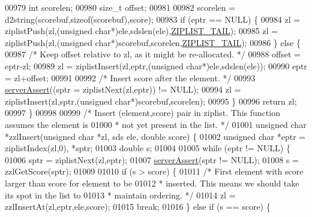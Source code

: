 \begin{DoxyCode}
00979     \textcolor{keywordtype}{int} scorelen;
00980     size\_t offset;
00981 
00982     scorelen = d2string(scorebuf,\textcolor{keyword}{sizeof}(scorebuf),score);
00983     \textcolor{keywordflow}{if} (eptr == NULL) \{
00984         zl = ziplistPush(zl,(\textcolor{keywordtype}{unsigned} \textcolor{keywordtype}{char}*)ele,sdslen(ele),\hyperlink{ziplist_8h_a25d058a2c2c0db0f131f84d23ede6ba2}{ZIPLIST\_TAIL});
00985         zl = ziplistPush(zl,(\textcolor{keywordtype}{unsigned} \textcolor{keywordtype}{char}*)scorebuf,scorelen,\hyperlink{ziplist_8h_a25d058a2c2c0db0f131f84d23ede6ba2}{ZIPLIST\_TAIL});
00986     \} \textcolor{keywordflow}{else} \{
00987         \textcolor{comment}{/* Keep offset relative to zl, as it might be re-allocated. */}
00988         offset = eptr-zl;
00989         zl = ziplistInsert(zl,eptr,(\textcolor{keywordtype}{unsigned} \textcolor{keywordtype}{char}*)ele,sdslen(ele));
00990         eptr = zl+offset;
00991 
00992         \textcolor{comment}{/* Insert score after the element. */}
00993         \hyperlink{server_8h_a88114b5169b4c382df6b56506285e56a}{serverAssert}((sptr = ziplistNext(zl,eptr)) != NULL);
00994         zl = ziplistInsert(zl,sptr,(\textcolor{keywordtype}{unsigned} \textcolor{keywordtype}{char}*)scorebuf,scorelen);
00995     \}
00996     \textcolor{keywordflow}{return} zl;
00997 \}
00998 
00999 \textcolor{comment}{/* Insert (element,score) pair in ziplist. This function assumes the element is}
01000 \textcolor{comment}{ * not yet present in the list. */}
01001 \textcolor{keywordtype}{unsigned} \textcolor{keywordtype}{char} *zzlInsert(\textcolor{keywordtype}{unsigned} \textcolor{keywordtype}{char} *zl, sds ele, \textcolor{keywordtype}{double} score) \{
01002     \textcolor{keywordtype}{unsigned} \textcolor{keywordtype}{char} *eptr = ziplistIndex(zl,0), *sptr;
01003     \textcolor{keywordtype}{double} s;
01004 
01005     \textcolor{keywordflow}{while} (eptr != NULL) \{
01006         sptr = ziplistNext(zl,eptr);
01007         \hyperlink{server_8h_a88114b5169b4c382df6b56506285e56a}{serverAssert}(sptr != NULL);
01008         s = zzlGetScore(sptr);
01009 
01010         \textcolor{keywordflow}{if} (s > score) \{
01011             \textcolor{comment}{/* First element with score larger than score for element to be}
01012 \textcolor{comment}{             * inserted. This means we should take its spot in the list to}
01013 \textcolor{comment}{             * maintain ordering. */}
01014             zl = zzlInsertAt(zl,eptr,ele,score);
01015             \textcolor{keywordflow}{break};
01016         \} \textcolor{keywordflow}{else} \textcolor{keywordflow}{if} (s == score) \{

\end{DoxyCode}
